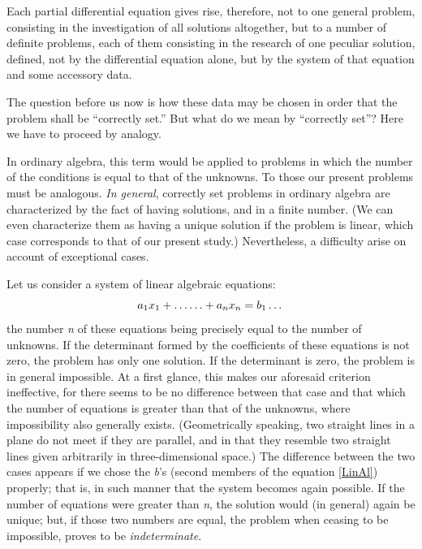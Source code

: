 \documentclass[12pt,oneside]{book}
\begin{document}
Each partial differential equation gives rise, therefore, not to one general
problem, consisting in the investigation of all solutions altogether, but to a
number of definite problems, each of them consisting in the research of one
peculiar solution, defined, not by the differential equation alone, but by the
system of that equation and some accessory data. \par

The question before us now is how these data may be chosen in order that the
problem shall be ``correctly set.'' But what do we mean by ``correctly set''?
Here we have to proceed by analogy. \par

In ordinary algebra, this term would be applied to problems in which the number
of the conditions is equal to that of the unknowns. To those our present
problems must be analogous. \textit{In general}, correctly set problems in
ordinary algebra are characterized by the fact of having solutions, and in a
finite number. (We can even characterize them as having a unique solution if the
problem is linear, which case corresponds to that of our present study.)
Nevertheless, a difficulty arise on account of exceptional cases. \par

Let us consider a system of linear algebraic equations:
\begin{equation}
    \label{LinAl}
    a_1x_1 + \dots\ldots + a_nx_n = b_1\ldots \\
\end{equation}
the number \textit{n} of these equations being precisely equal to the number of
unknowns.  If the determinant formed by the coefficients of these equations is
not zero, the problem has only one solution.  If the determinant is zero, the
problem is in general impossible. At a first glance, this makes our aforesaid
criterion ineffective, for there seems to be no difference between that case and
that which the number of equations is greater than that of the unknowns, where
impossibility also generally exists. (Geometrically speaking, two straight lines
in a plane do not meet if they are parallel, and in that they resemble two
straight lines given arbitrarily in three-dimensional space.) The difference
between the two cases appears if we chose the \textit{b}'s (second members of
the equation \ref{LinAl}) properly; that is, in such manner that the system
becomes again possible.  If the number of equations were greater than
\textit{n}, the solution would (in general) again be unique; but, if those two
numbers are equal, the problem when ceasing to be impossible, proves to be
\textit{indeterminate}. \par
\end{document}

